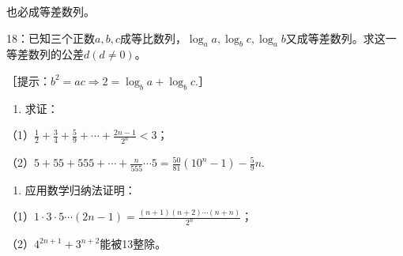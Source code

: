 也必成等差数列。

18：已知三个正数\(a, b, c\)成等比数列，\(\log_a a, \log_b c, \log_a b\)又成等差数列。求这一等差数列的公差\(d(d \neq 0)\)。

［提示：\(b^{2}=ac\Rightarrow2=\log_{b}a+\log_{b}c.\)］

\begin{enumerate}[start=19]
\item
  求证：
\end{enumerate}

（1）\(\frac{1}{2} + \frac{3}{4} + \frac{5}{9} + \cdots + \frac{2n - 1}{2^n} < 3\)；

（2）\(5 + 55 + 555 + \cdots + \frac{n}{555} \cdots 5 = \frac{50}{81}(10^n - 1) - \frac{5}{9} n.\)

\begin{enumerate}[start=20]
\item
  应用数学归纳法证明：
\end{enumerate}

（1）\(1 \cdot 3 \cdot 5 \cdots (2n - 1) = \frac{(n + 1)(n + 2) \cdots (n + n)}{2^n}\)；

（2）\(4^{2n + 1} + 3^{n + 2}\)能被13整除。

